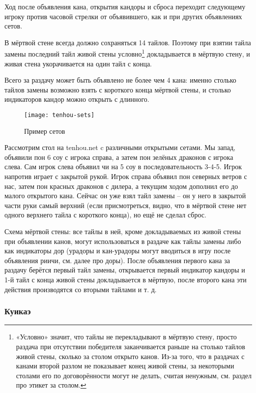 
Ход после объявления кана, открытия кандоры и сброса переходит следующему игроку против часовой стрелки от объявившего, как и при других объявлениях сетов. 

В мёртвой стене всегда должно сохраняться 14 тайлов. Поэтому при взятии тайла замены последний тайл живой стены условно\footnote{«Условно» значит, что тайлы не перекладывают в мёртвую стену, просто раздача при отсутствии победителя заканчивается раньше на столько тайлов живой стены, сколько за столом открыто канов. Из-за того, что в раздачах с канами второй разлом не показывает конец живой стены, за некоторыми столами его по договорённости могут не делать, считая ненужным, см. раздел про этикет за столом.} докладывается в мёртвую стену, и живая стена укорачивается на один тайл с конца.

Всего за раздачу может быть объявлено не более чем 4 кана: именно столько тайлов замены возможно взять с короткого конца мёртвой стены, и столько индикаторов кандор можно открыть с длинного.

\begin{figure}[H]
	\centering
	\texttt{[image: tenhou-sets]}
	\caption{Пример сетов}
\end{figure}

Рассмотрим стол на tenhou.net c различными открытыми сетами. Мы запад, объявили пон 6 соу с игрока справа, а затем пон зелёных драконов с игрока слева. Сам игрок слева объявил чи на 5 соу в последовательность 3-4-5. Игрок напротив играет с закрытой рукой. Игрок справа объявил пон северных ветров с нас, затем пон красных драконов с дилера, а текущим ходом дополнил его до малого открытого кана. Сейчас он уже взял тайл замены – он у него в закрытой части руки самый верхний (если присмотреться, видно, что в мёртвой стене нет одного верхнего тайла с короткого конца), но ещё не сделал сброс.

Схема мёртвой стены: все тайлы в ней, кроме докладываемых из живой стены при объявлении канов, могут использоваться в раздаче как тайлы замены либо как индикаторы дор (урадоры и кан-урадоры могут вводиться в игру после объявления риичи, см. далее про доры). После объявления первого кана за раздачу берётся первый тайл замены, открывается первый индикатор кандоры и 1-й тайл с конца живой стены докладывается в мёртвую, после второго кана эти действия производятся со вторыми тайлами и т. д. 

\subsubsection{Куикаэ}

